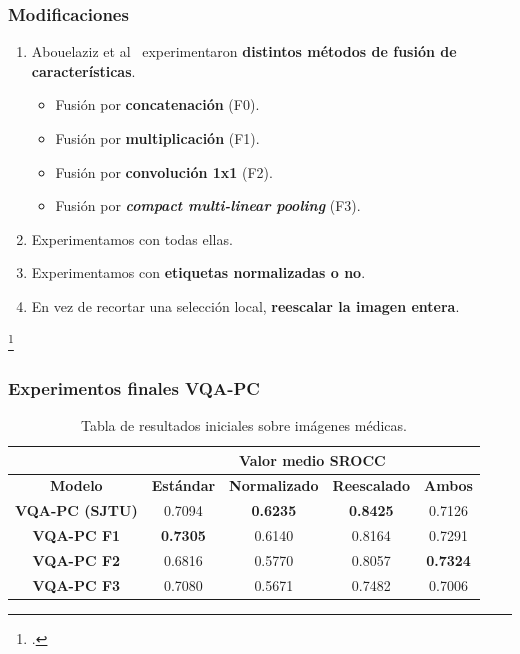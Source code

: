 \begin{frame}
  \frametitle{Modificaciones}
  \begin{enumerate}
    \item Abouelaziz et al\footnotemark~ experimentaron \textbf{distintos métodos de fusión de características}.
      \begin{itemize}
        \item Fusión por \textbf{concatenación} (F0).
        \item Fusión por \textbf{multiplicación} (F1). 
        \item Fusión por \textbf{convolución 1x1} (F2).
        \item Fusión por \textbf{\emph{compact multi-linear pooling}} (F3).
      \end{itemize}
    \item Experimentamos con todas ellas.
    \item Experimentamos con \textbf{etiquetas normalizadas o no}.
    \item En vez de recortar una selección local, \textbf{reescalar la imagen entera}.
  \end{enumerate}
  \footcitetext{EnsemblePCQA}
\end{frame}

\begin{frame}
  \frametitle{Experimentos finales VQA-PC}
\begin{table}[htp]
  \small
  \centering
\begin{tabular}{|c|cccc|}
\hline
\rowcolor[HTML]{FFC702}
                       & \multicolumn{4}{c|}{\textbf{Valor medio SROCC}}                                                                                                    \\ \hline
\rowcolor[HTML]{FFC702}
\textbf{Modelo}        & \multicolumn{1}{c|}{\textbf{Estándar}} & \multicolumn{1}{c|}{\textbf{Normalizado}} & \multicolumn{1}{c|}{\textbf{Reescalado}} & \textbf{Ambos}  \\ \hline
\textbf{VQA-PC (SJTU)} & \multicolumn{1}{c|}{0.7094}            & \multicolumn{1}{c|}{\textbf{0.6235}}      & \multicolumn{1}{c|}{\textbf{0.8425}}    & 0.7126          \\ \hline
\textbf{VQA-PC F1}     & \multicolumn{1}{c|}{\textbf{0.7305}}   & \multicolumn{1}{c|}{0.6140}               & \multicolumn{1}{c|}{0.8164}             & 0.7291          \\ \hline
\textbf{VQA-PC F2}     & \multicolumn{1}{c|}{0.6816}            & \multicolumn{1}{c|}{0.5770}               & \multicolumn{1}{c|}{0.8057}             & \textbf{0.7324} \\ \hline
\textbf{VQA-PC F3}     & \multicolumn{1}{c|}{0.7080}            & \multicolumn{1}{c|}{0.5671}      & \multicolumn{1}{c|}{0.7482}             & 0.7006          \\ \hline
\end{tabular}
\caption[Valor medio sobre imágenes médicas.]{Tabla de resultados iniciales sobre imágenes médicas.}
\label{tab:SroccMedRes}
\end{table}
\end{frame}


